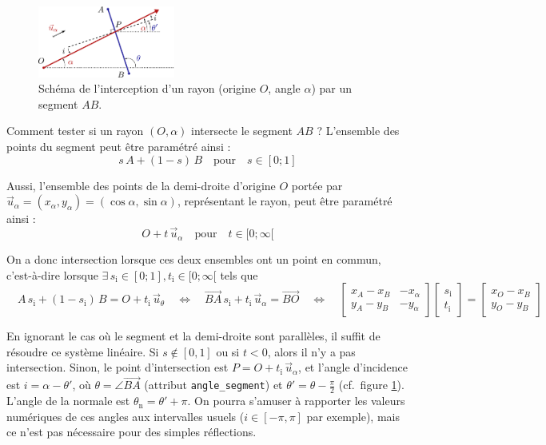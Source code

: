 \documentclass{book}
\newcommand{\inline}[1]{\texttt{#1}}
\begin{document}
\begin{figure}[H]
  \centering
  \includegraphics[width=0.4\textwidth]{TD5bis/isect-seg-dd.pdf}
  \caption{Schéma de l'interception d'un rayon (origine $O$, angle $\alpha$) par un segment $AB$.}
  \label{fig:isect-seg-dd}
\end{figure}

Comment tester si un rayon $(O,\alpha)$ intersecte le segment $AB$ ? L'ensemble des points du segment peut être paramétré ainsi :
$$s\,A + (1-s)\,B \quad \text{pour} \quad s \in [0;1]$$

Aussi, l'ensemble des points de la demi-droite d'origine $O$ portée par $\vec{u}_{\alpha}=(x_\alpha,y_\alpha)=(\cos \alpha, \sin \alpha)$, représentant le rayon, peut être paramétré ainsi :
$$O + t\,\vec{u}_{\alpha} \quad \text{pour} \quad t \in [0; \infty [$$

On a donc intersection lorsque ces deux ensembles ont un point en commun, c'est-à-dire lorsque $\exists\,s_{\text{i}} \in [0; 1], t_{\text{i}} \in [0; \infty[$ tels que
\begin{equation*}
  \quad A\,s_{\text{i}} + (1-s_{\text{i}})\,B = O + t_{\text{i}}\,\vec{u}_{\theta}
  \quad \Leftrightarrow \quad
  \overrightarrow{BA}\,s_{\text{i}} + t_{\text{i}}\,\vec{u}_{\alpha} = \overrightarrow{BO}
  \quad \Leftrightarrow \quad
  \left[\begin{array}{cc}
     x_A - x_B & - x_{\alpha}\\
     y_A - y_B & - y_{\alpha}
   \end{array}\right]  \left[\begin{array}{c}
     s_{\text{i}}\\
     t_{\text{i}}
   \end{array}\right] = \left[\begin{array}{c}
     x_O - x_B\\
     y_O - y_B
   \end{array}\right]
\end{equation*}

En ignorant le cas où le segment et la demi-droite sont parallèles, il
suffit de résoudre ce système linéaire. Si $s \notin [0, 1]$ ou si $t < 0$,
alors il n'y a pas intersection. Sinon, le point d'intersection est $P = O + t_{\text{i}}\,\vec{u}_{\alpha}$, et l'angle d'incidence est $i = \alpha - \theta'$, où $\theta = \angle \overrightarrow{B A}$ (attribut \inline{angle_segment}) et $\theta' = \theta - \frac{\pi}{2}$ (cf.\ figure \ref{fig:isect-seg-dd}). L'angle de la normale est $\theta_{\text{n}} = \theta' + \pi$. On pourra s'amuser à rapporter les valeurs numériques de ces angles aux intervalles usuels ($i\in[-\pi,\pi]$ par exemple), mais ce n'est pas nécessaire pour des simples réflections.\\
\end{document}
